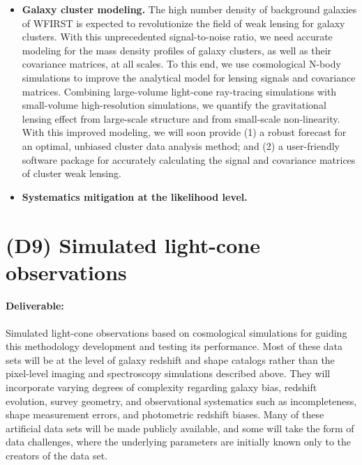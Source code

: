 \begin{itemize}
\item {\bf Galaxy cluster modeling.} The high number density of background galaxies of WFIRST is expected to revolutionize the field of weak lensing for galaxy clusters.  With this unprecedented signal-to-noise ratio, we need accurate modeling for the mass density profiles of galaxy clusters, as well as their covariance matrices, at all scales. To this end, we use cosmological N-body simulations to improve the analytical model for lensing signals and covariance matrices.  Combining large-volume light-cone ray-tracing simulations with small-volume high-resolution simulations, we quantify the gravitational lensing effect from large-scale structure and from small-scale non-linearity. With this improved modeling, we will soon provide (1) a robust forecast for an optimal, unbiased cluster data analysis method; and (2) a user-friendly software package for accurately calculating the signal and covariance matrices of cluster weak lensing.

\item {\bf Systematics mitigation at the likelihood level.} 

\end{itemize}



\section*{(D9) Simulated light-cone observations}

\paragraph*{Deliverable:} Simulated light-cone observations based on
cosmological simulations for guiding this methodology development and testing
its performance. Most of these data sets will be at the level of galaxy redshift
and shape catalogs rather than the pixel-level imaging and spectroscopy
simulations described above.  They will incorporate varying degrees of
complexity regarding galaxy bias, redshift evolution, survey geometry, and
observational systematics such as incompleteness, shape measurement errors, and
photometric redshift biases.  Many of these artificial data sets will be made
publicly available, and some will take the form of data challenges, where the
underlying parameters are initially known only to the creators of the data set.


